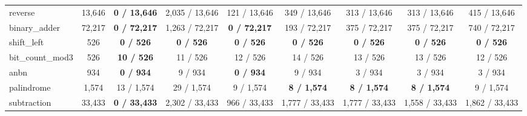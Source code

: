 \begin{table}[t]
{\begin{tabular}{l c c c c c c c c}
reverse        & 13{,}646 & \textbf{0 / 13{,}646}  & 2{,}035 / 13{,}646    & 121 / 13{,}646        & 349 / 13{,}646        & 313 / 13{,}646        & 313 / 13{,}646        & 415 / 13{,}646        \\
binary\_adder  & 72{,}217 & \textbf{0 / 72{,}217}  & 1{,}263 / 72{,}217    & \textbf{0 / 72{,}217} & 193 / 72{,}217        & 375 / 72{,}217        & 375 / 72{,}217        & 740 / 72{,}217        \\
shift\_left    & 526      & \textbf{0 / 526}       & \textbf{0 / 526}      & \textbf{0 / 526}      & \textbf{0 / 526}      & \textbf{0 / 526}      & \textbf{0 / 526}      & \textbf{0 / 526}      \\
bit\_count\_mod3 & 526    & \textbf{10 / 526}      & 11 / 526              & 12 / 526              & 14 / 526              & 13 / 526              & 13 / 526              & 12 / 526              \\
anbn           & 934      & \textbf{0 / 934}       & 9 / 934               & \textbf{0 / 934}      & 9 / 934               & 3 / 934               & 3 / 934               & 3 / 934               \\
palindrome     & 1{,}574  & 13 / 1{,}574           & 29 / 1{,}574          & 9 / 1{,}574           & \textbf{8 / 1{,}574}  & \textbf{8 / 1{,}574}  & \textbf{8 / 1{,}574}  & 9 / 1{,}574           \\
subtraction    & 33{,}433 & \textbf{0 / 33{,}433}  & 2{,}302 / 33{,}433    & 966 / 33{,}433        & 1{,}777 / 33{,}433    & 1{,}777 / 33{,}433    & 1{,}558 / 33{,}433    & 1{,}862 / 33{,}433    \\
\bottomrule
\end{tabular}}
\end{table}


